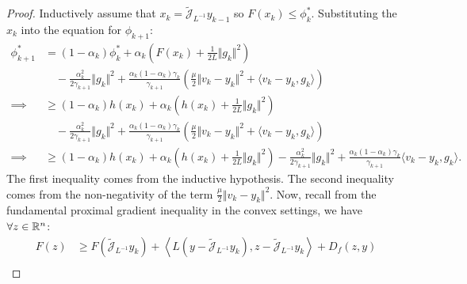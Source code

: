 \documentclass[12pt]{article}
\begin{document}
    \begin{proof}
        Inductively assume that $x_k = \widetilde{\mathcal J}_{L^{-1}}y_{k - 1}$ so $F(x_k) \le \phi_k^*$. 
        Substituting the $x_k$ into the equation for $\phi_{k + 1}$: 
        {\small
        \begin{align*}
            \phi_{k + 1}^* &= 
            (1 - \alpha_k) \phi_k^*
            + 
            \alpha_k
            \left(
                F(x_k) + \frac{1}{2L}\Vert g_k\Vert^2
            \right)
            \\&\quad 
                - \frac{\alpha_k^2}{2\gamma_{k + 1}}\Vert g_k\Vert^2
                + \frac{\alpha_k (1 - \alpha_k)\gamma_k}{\gamma_{k + 1}}
                \left(
                    \frac{\mu}{2}\Vert v_k - y_k\Vert^2 + \langle v_k - y_k, g_k\rangle
                \right)
            \\
            \implies 
            &\ge 
            (1 - \alpha_k)h(x_k)
            + 
            \alpha_k
            \left(
                h(x_k) + \frac{1}{2L}\Vert g_k\Vert^2
            \right)
            \\&\quad
                - \frac{\alpha_k^2}{2\gamma_{k + 1}}\Vert g_k\Vert^2
                + \frac{\alpha_k (1 - \alpha_k)\gamma_k}{\gamma_{k + 1}}
                \left(
                    \frac{\mu}{2}\Vert v_k - y_k\Vert^2 + \langle v_k - y_k, g_k\rangle
                \right)
            \\
            \implies
            &\ge 
            (1 - \alpha_k)h(x_k)
            + 
            \alpha_k
            \left(
                h(x_k) + \frac{1}{2L}\Vert g_k\Vert^2
            \right)
            - \frac{\alpha_k^2}{2\gamma_{k + 1}}\Vert g_k\Vert^2
            + 
            \frac{\alpha_k (1 - \alpha_k)\gamma_k}{\gamma_{k + 1}}
            \langle v_k - y_k, g_k\rangle. 
        \end{align*}
        }
        The first inequality comes from the inductive hypothesis. 
        The second inequality comes from the non-negativity of the term $\frac{\mu}{2}\Vert v_k - y_k\Vert^2$. 
        Now, recall from the fundamental proximal gradient inequality in the convex settings, we have $\forall z\in \mathbb R^n$: 
        \begin{align*}
            F(z) &\ge 
            F\left(\widetilde{\mathcal J}_{L^{-1}}y_k\right)
            + \left\langle 
                L(y - \widetilde{\mathcal J}_{L^{-1}}y_k), 
                z - \widetilde{\mathcal J}_{L^{-1}}y_k
            \right\rangle + D_f(z, y)
            \\

\end{align*}
\end{proof}
\end{document}

